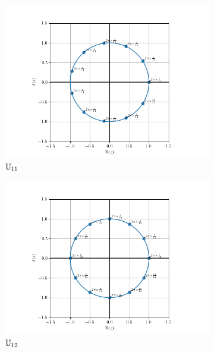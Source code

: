 \begin{figure}
\begin{subfigure}{.3\textwidth}
        \includegraphics[scale=.33]{U_11.png}  
        \caption{$\mathbb{U}_{11}$}
        \label{fig:U11}
    \end{subfigure}
    \newline
    \begin{subfigure}{.3\textwidth}
        \centering
        \includegraphics[scale=.33]{U_12.png}  
        \caption{$\mathbb{U}_{12}$}
        \label{fig:U12}      
    \end{subfigure}
    \begin{subfigure}{.3\textwidth}
        \centering

\end{subfigure}
\end{figure}
